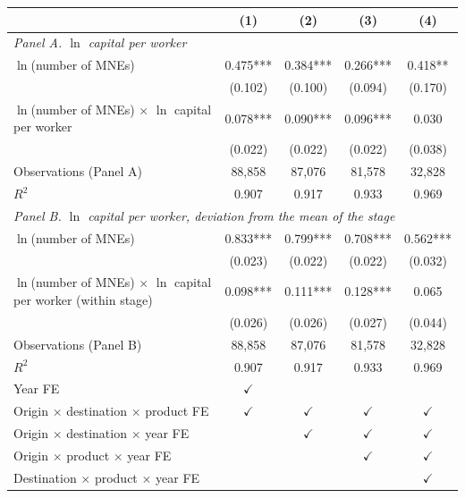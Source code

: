 \begin{tabular}{l*{4}{c}}
\toprule
 & (1) & (2) & (3) & (4) \\
\midrule
\multicolumn{5}{l}{\textit{Panel A. $\ln$ capital per worker}} \\
$\ln$(number of MNEs) & 0.475*** & 0.384*** & 0.266*** & 0.418** \\
 & (0.102) & (0.100) & (0.094) & (0.170) \\
$\ln$(number of MNEs) $\times$ $\ln$ capital per worker & 0.078*** & 0.090*** & 0.096*** & 0.030 \\
 & (0.022) & (0.022) & (0.022) & (0.038) \\
Observations (Panel A) & 88,858 & 87,076 & 81,578 & 32,828 \\
$R^2$ & 0.907 & 0.917 & 0.933 & 0.969 \\
\midrule
\multicolumn{5}{l}{\textit{Panel B. $\ln$ capital per worker, deviation from the mean of the stage}} \\
$\ln$(number of MNEs) & 0.833*** & 0.799*** & 0.708*** & 0.562*** \\
 & (0.023) & (0.022) & (0.022) & (0.032) \\
$\ln$(number of MNEs) $\times$ $\ln$ capital per worker (within stage) & 0.098*** & 0.111*** & 0.128*** & 0.065 \\
 & (0.026) & (0.026) & (0.027) & (0.044) \\
Observations (Panel B) & 88,858 & 87,076 & 81,578 & 32,828 \\
$R^2$ & 0.907 & 0.917 & 0.933 & 0.969 \\
\midrule
Year FE & $\checkmark$ &  &  &  \\
Origin $\times$ destination $\times$ product FE & $\checkmark$ & $\checkmark$ & $\checkmark$ & $\checkmark$ \\
Origin $\times$ destination $\times$ year FE &  & $\checkmark$ & $\checkmark$ & $\checkmark$ \\
Origin $\times$ product $\times$ year FE &  &  & $\checkmark$ & $\checkmark$ \\
Destination $\times$ product $\times$ year FE &  &  &  & $\checkmark$ \\
\bottomrule
\end{tabular}
